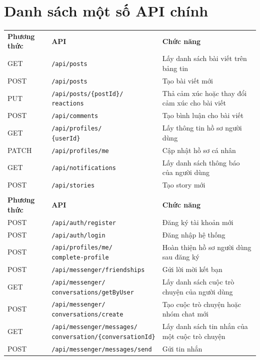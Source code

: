 \documentclass[a4paper,12pt]{article}
\begin{document}
\section{Danh sách một số API chính}

\small
\begin{longtable}{|>{\raggedright\arraybackslash}p{1.8cm}|>{\raggedright\arraybackslash}p{5.2cm}|>{\raggedright\arraybackslash}p{7cm}|}
\hline
\multicolumn{3}{|c|}{\textbf{C\# API (ASP.NET Core)}} \\
\hline
\textbf{Phương thức} & \textbf{API} & \textbf{Chức năng} \\
\hline
GET & \texttt{/api/posts} & Lấy danh sách bài viết trên bảng tin \\
\hline
POST & \texttt{/api/posts} & Tạo bài viết mới \\
\hline
PUT & \makecell[l]{\texttt{/api/posts/\{postId\}/}\\\texttt{reactions}} & Thả cảm xúc hoặc thay đổi cảm xúc cho bài viết \\
\hline
POST & \texttt{/api/comments} & Tạo bình luận cho bài viết \\
\hline
GET & \makecell[l]{\texttt{/api/profiles/}\\\texttt{\{userId\}}} & Lấy thông tin hồ sơ người dùng \\
\hline
PATCH & \texttt{/api/profiles/me} & Cập nhật hồ sơ cá nhân \\
\hline
GET & \texttt{/api/notifications} & Lấy danh sách thông báo của người dùng \\
\hline
POST & \texttt{/api/stories} & Tạo story mới \\
\hline

\multicolumn{3}{|c|}{\textbf{Java API (Spring Boot)}} \\
\hline
\textbf{Phương thức} & \textbf{API} & \textbf{Chức năng} \\
\hline
POST & \texttt{/api/auth/register} & Đăng ký tài khoản mới \\
\hline
POST & \texttt{/api/auth/login} & Đăng nhập hệ thống \\
\hline
POST & \makecell[l]{\texttt{/api/profiles/me/}\\\texttt{complete-profile}} & Hoàn thiện hồ sơ người dùng sau đăng ký \\
\hline
POST & \texttt{/api/messenger/friendships} & Gửi lời mời kết bạn \\
\hline
GET & \makecell[l]{\texttt{/api/messenger/}\\\texttt{conversations/getByUser}} & Lấy danh sách cuộc trò chuyện của người dùng \\
\hline
POST & \makecell[l]{\texttt{/api/messenger/}\\\texttt{conversations/create}} & Tạo cuộc trò chuyện hoặc nhóm chat mới \\
\hline
GET & \makecell[l]{\texttt{/api/messenger/messages/}\\\texttt{conversation/\{conversationId\}}} & Lấy danh sách tin nhắn của một cuộc trò chuyện \\
\hline
POST & \texttt{/api/messenger/messages/send} & Gửi tin nhắn \\
\hline
\end{longtable}
\end{document}
